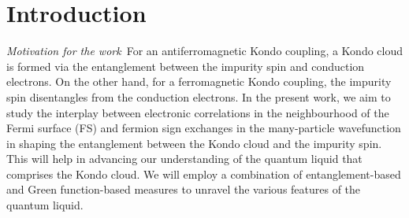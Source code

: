 \documentclass[aps,prl,preprint,groupedaddress]{revtex4-2}
\begin{document}
\section{Introduction}
\par\noindent
\emph{Motivation for the work}~For an antiferromagnetic Kondo coupling, a Kondo cloud is formed via the entanglement between the impurity spin and conduction electrons. On the other hand, for a ferromagnetic Kondo coupling, the impurity spin disentangles from the conduction electrons. In the present work, we aim to study the interplay between electronic correlations in the neighbourhood of the Fermi surface (FS) and fermion sign exchanges in the many-particle wavefunction in shaping the entanglement between the Kondo cloud and the impurity spin. This will help in advancing our understanding of the quantum liquid that comprises the Kondo cloud. We will employ a  combination of entanglement-based and Green function-based measures to unravel the various features of the quantum liquid.
\end{document}
